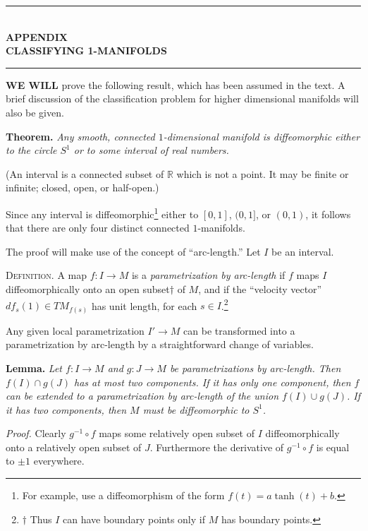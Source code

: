 
\begin{center}
\rule{0.8\textwidth}{0.4pt}\\[0.6em]
{\large\bfseries APPENDIX}\\[0.3em]
{\Large\bfseries CLASSIFYING 1-MANIFOLDS}\\[0.6em]
\rule{0.8\textwidth}{0.4pt}
\end{center}

\noindent\textbf{WE WILL} prove the following result, which has been assumed in the text. A brief discussion of the classification problem for higher dimensional manifolds will also be given.

\noindent\textbf{Theorem.} \textit{Any smooth, connected $1$-dimensional manifold is diffeomorphic either to the circle $S^1$ or to some interval of real numbers.}

(An interval is a connected subset of $\mathbb{R}$ which is not a point. It may be finite or infinite; closed, open, or half-open.)

Since any interval is diffeomorphic\footnote{For example, use a diffeomorphism of the form $f(t) = a \tanh(t) + b$.} either to $[0, 1]$, $(0, 1]$, or $(0, 1)$, it follows that there are only four distinct connected $1$-manifolds.

The proof will make use of the concept of ``arc-length.'' Let $I$ be an interval.

\textsc{Definition.} A map $f : I \to M$ is a \emph{parametrization by arc-length} if $f$ maps $I$ diffeomorphically onto an open subset$\dagger$ of $M$, and if the ``velocity vector'' $df_s(1) \in TM_{f(s)}$ has unit length, for each $s \in I$.\footnote{$\dagger$ Thus $I$ can have boundary points only if $M$ has boundary points.}

Any given local parametrization $I' \to M$ can be transformed into a parametrization by arc-length by a straightforward change of variables.

\noindent\textbf{Lemma.} \textit{Let $f : I \to M$ and $g : J \to M$ be parametrizations by arc-length. Then $f(I) \cap g(J)$ has at most two components. If it has only one component, then $f$ can be extended to a parametrization by arc-length of the union $f(I) \cup g(J)$. If it has two components, then $M$ must be diffeomorphic to $S^1$.}




\noindent\textit{Proof.}
Clearly $g^{-1} \circ f$ maps some relatively open subset of $I$ diffeomorphically onto a relatively open subset of $J$. Furthermore the derivative of $g^{-1} \circ f$ is equal to $\pm 1$ everywhere.

